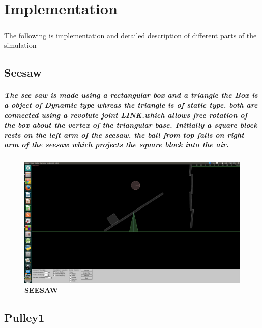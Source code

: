 \chapter{Implementation}
\paragraph{}The following is implementation and detailed description of different parts of the simulation

\section{Seesaw}
\paragraph{
The see saw is made using a rectangular box and a triangle
the Box is a object of Dynamic type whreas the triangle is of static type.
both are connected using a revolute joint \textbf{LINK}.which allows free rotation of the box about the vertex of the triangular base.
Initially a square block rests on the left arm of the seesaw.
the ball from top falls on right arm of the seesaw which projects the square block into the air.
}
\begin{figure}[H]
  \centering
    \includegraphics[scale=0.2]{project/images/pulley.png}
  \caption{\textbf{SEESAW}}
\end{figure}

\section{Pulley1}
